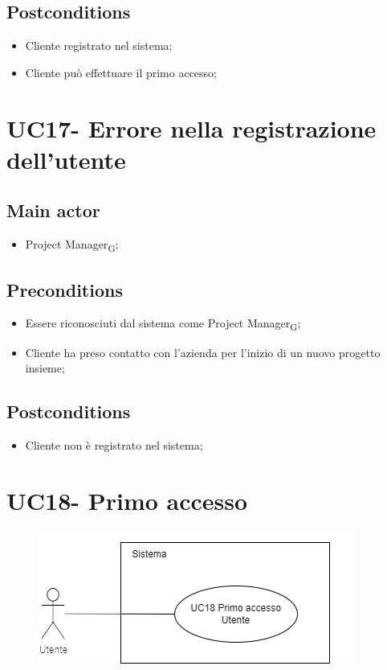 \documentclass{article}
\begin{document}
    \subsection*{Postconditions}
        \begin{itemize}
            \item Cliente registrato nel sistema;
            \item Cliente può effettuare il primo accesso;
        \end{itemize}

\section{UC17- Errore nella registrazione dell'utente}
\subsection*{Main actor}
        \begin{itemize}
            \item Project Manager\textsubscript{G};
        \end{itemize}
        
    \subsection*{Preconditions}
        \begin{itemize}
            \item Essere riconosciuti dal sistema come Project Manager\textsubscript{G};
            \item Cliente ha preso contatto con l'azienda per l'inizio di un nuovo progetto insieme;
        \end{itemize}
        
    \subsection*{Postconditions}
        \begin{itemize}
            \item Cliente non è registrato nel sistema;
        \end{itemize}
\section{UC18- Primo accesso}
 \begin{figure}[h]
          \centering
          \includegraphics{./imgUML/UC18.png}
          \label{fig:immagine}
        \end{figure}
\end{document}
